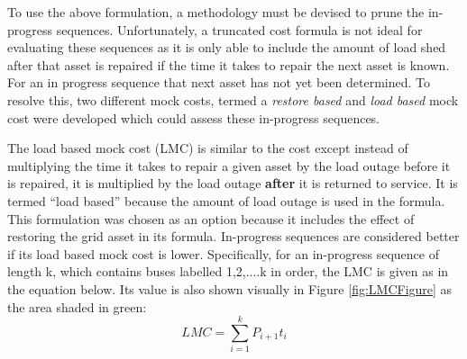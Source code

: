 \documentclass[12pt]{article}
\begin{document}
To use the above formulation, a methodology must be devised to prune the in-progress sequences. Unfortunately, a truncated cost formula is not ideal for evaluating these sequences as it is only able to include the amount of load shed after that asset is repaired if the time it takes to repair the next asset is known. For an in progress sequence that next asset has not yet been determined. To resolve this, two different mock costs, termed a \textit{restore based} and \textit{load based} mock cost were developed which could assess these in-progress sequences. \par
The load based mock cost (LMC) is similar to the cost except instead of multiplying the time it takes to repair a given asset by the load outage before it is repaired, it is multiplied by the load outage \textbf{after} it is returned to service. It is termed “load based” because the amount of load outage is used in the formula. This formulation was chosen as an option because it includes the effect of restoring the grid asset in its formula. In-progress sequences are considered better if its load based mock cost is lower. Specifically, for an in-progress sequence of length k, which contains buses labelled 1,2,....k in order, the LMC is given as in the equation below. Its value is also shown visually in Figure \ref{fig:LMCFigure} as the area shaded in green:
\begin{equation} 
    LMC =\sum_{i=1}^{k}{P_{i+1}t_i}
    \label{eq:ldmockcost}
\end{equation}
\end{document}
